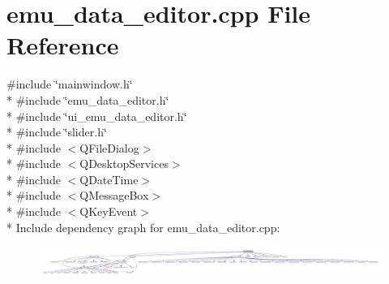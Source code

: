 \hypertarget{a00035}{\section{emu\+\_\+data\+\_\+editor.\+cpp File Reference}
\label{a00035}
}
{\ttfamily \#include \char`\"{}mainwindow.\+h\char`\"{}}\\*
{\ttfamily \#include \char`\"{}emu\+\_\+data\+\_\+editor.\+h\char`\"{}}\\*
{\ttfamily \#include \char`\"{}ui\+\_\+emu\+\_\+data\+\_\+editor.\+h\char`\"{}}\\*
{\ttfamily \#include \char`\"{}slider.\+h\char`\"{}}\\*
{\ttfamily \#include $<$Q\+File\+Dialog$>$}\\*
{\ttfamily \#include $<$Q\+Desktop\+Services$>$}\\*
{\ttfamily \#include $<$Q\+Date\+Time$>$}\\*
{\ttfamily \#include $<$Q\+Message\+Box$>$}\\*
{\ttfamily \#include $<$Q\+Key\+Event$>$}\\*
Include dependency graph for emu\+\_\+data\+\_\+editor.\+cpp\+:
\nopagebreak
\begin{figure}[H]
\begin{center}
\leavevmode
\includegraphics[width=350pt]{d7/d9a/a00152}
\end{center}
\end{figure}
